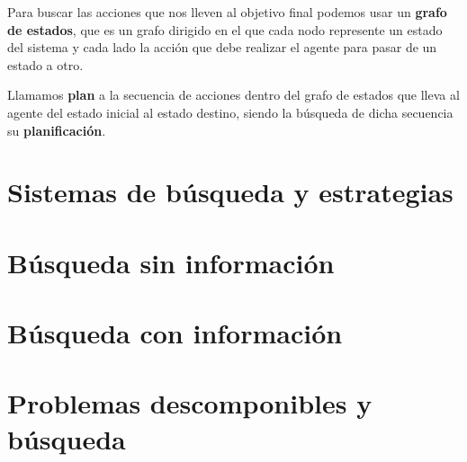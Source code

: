Para buscar las acciones que nos lleven al objetivo final podemos usar un \textbf{grafo de estados}, que es un grafo dirigido en el que cada nodo represente un estado del sistema y cada lado la acción que debe realizar el agente para pasar de un estado a otro.

Llamamos \textbf{plan} a la secuencia de acciones dentro del grafo de estados que lleva al agente del estado inicial al estado destino, siendo la búsqueda de dicha secuencia su \textbf{planificación}.

\begin{center}
\end{center}

\section{Sistemas de búsqueda y estrategias}

\section{Búsqueda sin información}

\section{Búsqueda con información}

\section{Problemas descomponibles y búsqueda}
